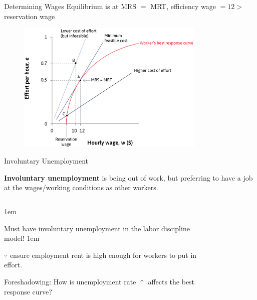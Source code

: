\documentclass[11pt,aspectratio=43,usenames,dvipsnames]{beamer}
\let\olditemize=\itemize
\let\endolditemize=\enditemize
\renewenvironment{itemize}{\olditemize \itemsep1em}{\endolditemize}
\theoremstyle{definition}
\begin{document}
\begin{frame}{Determining Wages}
\label{slide:Determining_Wages}
    Equilibrium is at MRS $ = $ MRT, efficiency wage $ = 12 >$ reservation wage
    \begin{figure}
        \centering
        \includegraphics[width=0.8\textwidth]{./figures/EquilibriumLaborMkt.png}
    \end{figure}

\end{frame}

\begin{frame}{Involuntary Unemployment}
\label{slide:Involuntary_Unemployment}
    \begin{definition}
        \textbf{Involuntary unemployment} is being out of work, but preferring to have a job at the wages/working conditions as other workers.
    \end{definition}
    \begin{columns}
        \begin{column}{0.5\textwidth}
            \begin{itemize}
                \item Must have involuntary unemployment in the labor discipline model!
                \begin{itemize}
                    \item $ \because $ ensure employment rent is high enough for workers to put in effort.
                \end{itemize}
                \item Foreshadowing: How is unemployment rate $ \uparrow  $ affects the best response curve?
            \end{itemize}
        \end{column}
        \begin{column}{0.5\textwidth}
            \begin{figure}
                \centering
                
            \end{figure}
        \end{column}
    \end{columns}
\end{frame}
\end{document}
